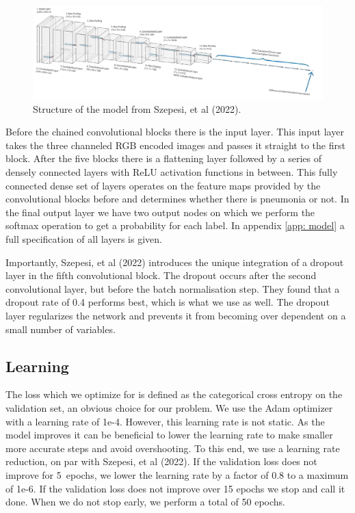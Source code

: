 \documentclass[a4paper]{article}
\begin{document}
\begin{figure}[h]
	\centering
	\includegraphics[width = \textwidth]{imgs/model.png}
	\caption{Structure of the model from Szepesi, et al (2022).}
	\label{fig: model}
\end{figure}

Before the chained convolutional blocks there is the input layer. This input
layer takes the three channeled RGB encoded images and passes it straight to
the first block. After the five blocks there is a flattening layer followed by
a series of densely connected layers with ReLU activation functions in between.
This fully connected dense set of layers operates on the feature maps provided
by the convolutional blocks before and determines whether there is pneumonia or
not. In the final output layer we have two output nodes on which we perform the
softmax operation to get a probability for each label. In appendix \ref{app:
model} a full specification of all layers is given.

Importantly, Szepesi, et al (2022) introduces the unique integration of a
dropout layer in the fifth convolutional block. The dropout occurs after the
second convolutional layer, but before the batch normalisation step. They found
that a dropout rate of 0.4 performs best, which is what we use as well. The
dropout layer regularizes the network and prevents it from becoming over dependent on
a small number of variables.

\subsection{Learning}

The loss which we optimize for is defined as the categorical cross entropy on
the validation set, an obvious choice for our problem. We use the Adam
optimizer with a learning rate of 1e-4. However, this learning rate is not
static. As the model improves it can be beneficial to lower the learning rate
to make smaller more accurate steps and avoid overshooting. To this end, we use
a learning rate reduction, on par with Szepesi, et al (2022). If the validation
loss does not improve for 5~epochs, we lower the learning rate by a factor
of 0.8 to a maximum of 1e-6. If the validation loss does not improve over 15
epochs we stop and call it done. When we do not stop early, we perform a
total of 50 epochs.
\end{document}
